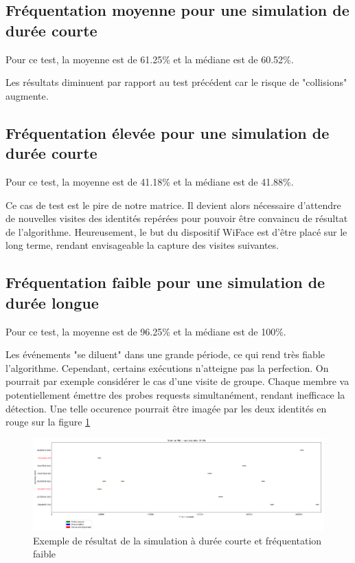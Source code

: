 \subsection{Fréquentation moyenne pour une simulation de durée courte}
Pour ce test, la moyenne est de 61.25\% et la médiane est de 60.52\%.

Les résultats diminuent par rapport au test précédent car le risque de "collisions" augmente.

\subsection{Fréquentation élevée pour une simulation de durée courte}
Pour ce test, la moyenne est de 41.18\% et la médiane est de 41.88\%.

Ce cas de test est le pire de notre matrice. Il devient alors nécessaire d'attendre de nouvelles visites des identités
repérées pour pouvoir être convaincu de résultat de l'algorithme. Heureusement, le but du dispositif WiFace est d'être placé sur le long terme, rendant envisageable la capture des
visites suivantes.

\subsection{Fréquentation faible pour une simulation de durée longue}
Pour ce test, la moyenne est de 96.25\% et la médiane est de 100\%.

Les événements "se diluent" dans une grande période, ce qui rend très fiable l'algorithme. 
Cependant, certains exécutions n'atteigne pas la perfection. On pourrait par exemple considérer le cas d'une 
visite de groupe. Chaque membre va potentiellement émettre des probes requests simultanément, rendant inefficace la détection.
Une telle occurence pourrait être imagée par les deux identités en rouge sur la figure \ref{fig:simulation-long-low}
\clearpage
\newpage
\thispagestyle{empty}
\begin{landscape}
    \centering
\thispagestyle{empty}
\begin{figure}[h]
	\includegraphics[width=\linewidth]{images/tests/exemple_longue_faible.png}
	\caption{Exemple de résultat de la simulation à durée courte et fréquentation faible}
	\label{fig:simulation-long-low}
\end{figure}
\end{landscape}

